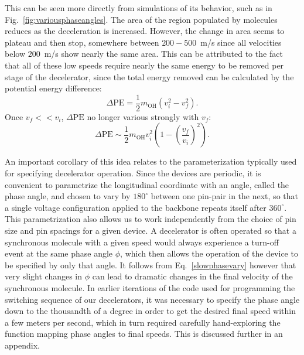 This can be seen more directly from simulations of its behavior, such as in Fig.~\ref{fig:variousphaseangles}. The area of the region populated by molecules reduces as the deceleration is increased.
However, the change in area seems to plateau and then stop, somewhere between $200-500$~m/s since all velocities below $200$~m/s show nearly the same area.
This can be attributed to the fact that all of these low speeds require nearly the same energy to be removed per stage of the decelerator, since the total energy removed can be calculated by the potential energy difference:
\begin{equation}
\Delta\text{PE}=\frac{1}{2}m_\text{OH}\left(v_i^2-v_f^2\right).
\end{equation}
Once $v_f << v_i$, $\Delta\text{PE}$ no longer various strongly with $v_f$:
\begin{equation}
\label{slowphasevary}
\Delta\text{PE}\sim\frac{1}{2}m_\text{OH}v_i^2\left(1-\left(\frac{v_f}{v_i}\right)^2\right).
\end{equation}

An important corollary of this idea relates to the parameterization typically used for specifying decelerator operation.
Since the devices are periodic, it is convenient to parametrize the longitudinal coordinate with an angle, called the phase angle, and chosen to vary by $180^\circ$ between one pin-pair in the next, so that a single voltage configuration applied to the backbone repeats itself after $360^\circ$.
This parametrization also allows us to work independently from the choice of pin size and pin spacings for a given device.
A decelerator is often operated so that a synchronous molecule with a given speed would always experience a turn-off event at the same phase angle $\phi$, which then allows the operation of the device to be specified by only that angle.
It follows from Eq.~\ref{slowphasevary} however that very slight changes in $\phi$ can lead to dramatic changes in the final velocity of the synchronous molecule.
In earlier iterations of the code used for programming the switching sequence of our decelerators, it was necessary to specify the phase angle down to the thousandth of a degree in order to get the desired final speed within a few meters per second, which in turn required carefully hand-exploring the function mapping phase angles to final speeds.
This is discussed further in an appendix.

